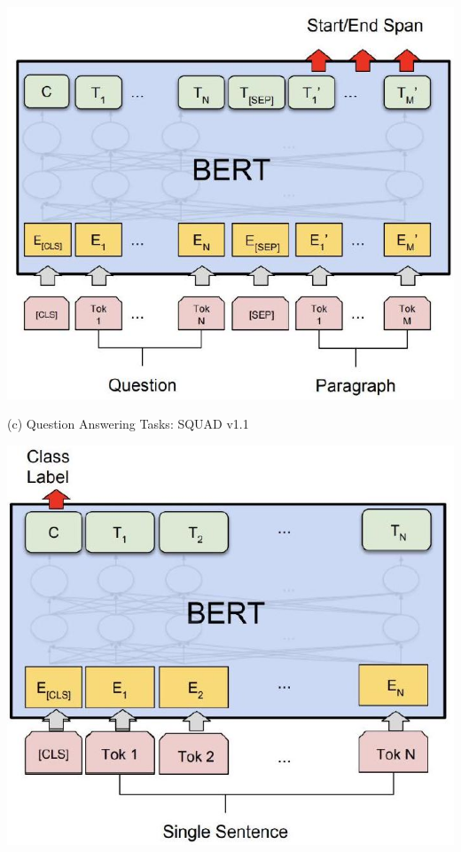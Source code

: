 \documentclass[10pt]{article}
\begin{document}
\begin{center}
\includegraphics[max width=\textwidth]{2024_01_08_7c14f4867d7823fc5a52g-06(1)}
\end{center}

(c) Question Answering Tasks: SQUAD v1.1

\begin{center}
\includegraphics[max width=\textwidth]{2024_01_08_7c14f4867d7823fc5a52g-06}
\end{center}
\end{document}
